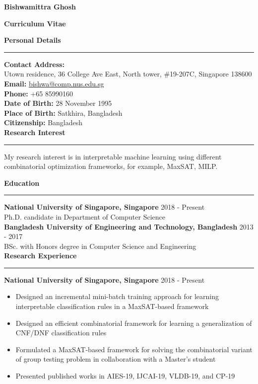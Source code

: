 \documentclass[a4paper,11pt,final]{article}
\newcommand{\Sep}{\vspace{1.5em}}
\newcommand{\SmallSep}{\vspace{0.5em}}
\begin{document}
	
	\begin{center}
		\Huge \textbf{Bishwamittra Ghosh}\\
		\vspace{0.2em}	
		\Large \centerline{ \textbf{Curriculum Vitae}}
	\end{center}
	
	\Sep
	\Large { \textbf{Personal Details}}\\
	\noindent\rule{\textwidth}{1pt}
	\normalsize 
	 \textbf{Contact Address:} \\Utown residence, 36 College Ave East, 	 North tower, $ \# $19-207C, Singapore 138600\\
	\textbf{Email:} \url{bishwa@comp.nus.edu.sg}  \\
	\textbf{Phone:} +65 85990160\\
	\textbf{Date of Birth:}  28  November  1995 \\
	\textbf{Place of Birth:} Satkhira, Bangladesh\\
	\textbf{Citizenship:} Bangladesh\\

	\Sep	
\Large { \textbf{Research Interest}}\\
\noindent\rule{\textwidth}{1pt}
\normalsize
My research interest is in interpretable machine learning using different combinatorial optimization frameworks, for example, MaxSAT, MILP. 
	
	\Sep	
\Large { \textbf{Education}}\\
\noindent\rule{\textwidth}{1pt}
\normalsize
\textbf{National University of Singapore, Singapore}
\hspace*{\fill} 2018  - Present\\
Ph.D. candidate in Department of Computer Science\\

\SmallSep
\textbf{Bangladesh University of Engineering and Technology, Bangladesh}
\hspace*{\fill} 2013  -  2017\\
BSc. with Honors degree in Computer Science and Engineering\\


\Sep
\Large { \textbf{Research Experience}}\\
\noindent\rule{\textwidth}{1pt}
\normalsize
\textbf{National University of Singapore, Singapore} \hspace*{\fill} 2018  - Present\\
\begin{itemize}
	\item Designed an incremental mini-batch training approach for learning interpretable classification rules in a MaxSAT-based framework
	\item Designed an efficient combinatorial framework for learning a generalization of CNF/DNF classification rules
	\item Formulated a MaxSAT-based framework for solving the combinatorial variant of group testing problem in collaboration with a Master's student
	\item Presented published works in AIES-19, IJCAI-19, VLDB-19, and CP-19
\end{itemize} 
\end{document}
